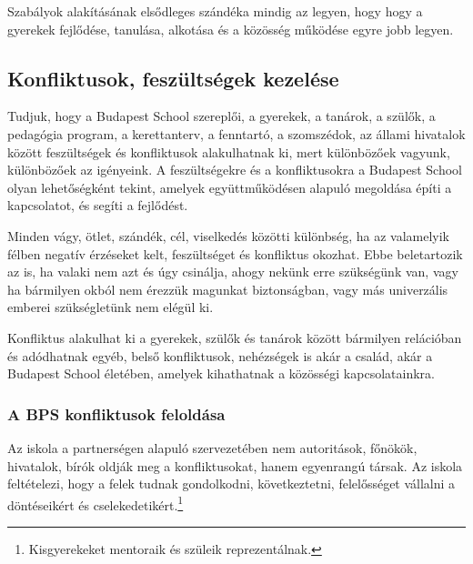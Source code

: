 Szabályok alakításának elsődleges szándéka mindig az legyen, hogy hogy a gyerekek fejlődése, tanulása, alkotása és a közösség működése egyre jobb legyen.

\subsection{Konfliktusok, feszültségek kezelése}
\label{sec:konfliktusok_kezelese}
Tudjuk, hogy a Budapest School szereplői, a gyerekek, a tanárok, a szülők, a pedagógia program, a kerettanterv, a fenntartó, a szomszédok, az állami hivatalok  között feszültségek és konfliktusok alakulhatnak ki, mert különbözőek vagyunk, különbözőek az igényeink. A feszültségekre és a konfliktusokra a Budapest School olyan lehetőségként tekint, amelyek együttműködésen alapuló megoldása építi a kapcsolatot, és segíti a fejlődést.

Minden vágy, ötlet, szándék, cél, viselkedés közötti különbség, ha az valamelyik félben negatív érzéseket kelt, feszültséget és konfliktus okozhat. Ebbe beletartozik az is, ha valaki nem azt és úgy csinálja, ahogy nekünk erre szükségünk van, vagy ha bármilyen okból nem érezzük magunkat biztonságban, vagy más univerzális emberei szükségletünk \citep{rosenberg2003nonviolent} nem elégül ki.

Konfliktus alakulhat ki a gyerekek, szülők és tanárok között bármilyen relációban és adódhatnak egyéb, belső konfliktusok, nehézségek is akár a család, akár a Budapest School életében, amelyek kihathatnak a közösségi kapcsolatainkra.

\subsubsection{A BPS konfliktusok feloldása}

Az iskola a partnerségen alapuló szervezetében nem autoritások, főnökök, hivatalok, bírók oldják meg a konfliktusokat, hanem egyenrangú társak. Az iskola feltételezi, hogy a felek tudnak gondolkodni, következtetni, felelősséget vállalni a döntéseikért és cselekedetikért.\footnote{Kisgyerekeket mentoraik és szüleik reprezentálnak.}

